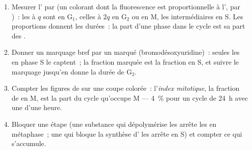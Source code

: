 \begin{method}\label{met:b1:replication-mitosis:reading}
\begin{enumerate}
  \item Mesurer l' par  (un colorant dont la fluorescence est
        proportionnelle à l',  par )~: les  à
        $q$ sont en G$_1$, celles à $2q$ en G$_2$ ou en M, les
        intermédiaires en S. Les proportions donnent les durées~: la
        part d'une phase dans le cycle est sa part des .
  \item Donner un marquage bref par un  marqué
        (bromodésoxyuridine)~: seules les  en phase S le
        captent~; la fraction marquée est la fraction en S, et suivre le
        marquage jusqu'en  donne la durée de G$_2$.
  \item Compter les figures de  sur une coupe colorée~:
        l'\emph{index mitotique}, la fraction de  en M, est la
        part du cycle qu'occupe M --- \qty{4}{\%} pour un cycle de
        \qty{24}{h} avec une  d'une heure.
  \item Bloquer une étape (une substance qui dépolymérise les
         arrête les  en métaphase~; une qui bloque
        la synthèse d' les arrête en S) et compter ce qui s'accumule.
\end{enumerate}
\end{method}

